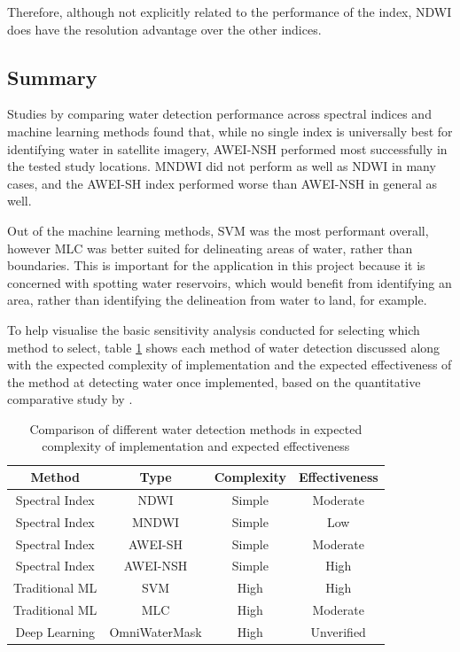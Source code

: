 Therefore, although not explicitly related to the performance of the index, NDWI does have the resolution advantage over the other indices.

\subsection{Summary}
Studies by \cite{kirby_ferguson_rennie_cousineau_nistor_2024} comparing water detection performance across spectral indices and machine learning methods found that, while no single index is universally best for identifying water in satellite imagery, AWEI-NSH performed most successfully in the tested study locations. MNDWI did not perform as well as NDWI in many cases, and the AWEI-SH index performed worse than AWEI-NSH in general as well. 

Out of the machine learning methods, SVM was the most performant overall, however MLC was better suited for delineating areas of water, rather than boundaries. This is important for the application in this project because it is concerned with spotting water reservoirs, which would benefit from identifying an area, rather than identifying the delineation from water to land, for example. 

To help visualise the basic sensitivity analysis conducted for selecting which method to select, table \ref{tab:water detection comparisons} shows each method of water detection discussed along with the expected complexity of implementation and the expected effectiveness of the method at detecting water once implemented, based on the quantitative comparative study by \cite{kirby_ferguson_rennie_cousineau_nistor_2024}.

\begin{table}[ht]
\centering
\begin{tabular}{|c|c|c|c|}
\hline
\textbf{Method} & \textbf{Type} & \textbf{Complexity} & \textbf{Effectiveness} \\
\hline
Spectral Index & NDWI & Simple & Moderate \\
Spectral Index & MNDWI & Simple & Low \\
Spectral Index & AWEI-SH & Simple & Moderate \\
Spectral Index & AWEI-NSH & Simple & High \\
Traditional ML & SVM & High & High \\
Traditional ML & MLC & High & Moderate \\
Deep Learning & OmniWaterMask & High & Unverified \\
\hline
\end{tabular}
\caption{Comparison of different water detection methods in expected complexity of implementation and expected effectiveness}
\label{tab:water detection comparisons}
\end{table}

